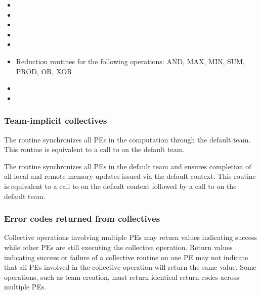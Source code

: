 \begin{DeprecateBlock}
\begin{itemize}
\item {}
\item {}
\item {}
\item {}
\item {}
\item Reduction routines for the following operations: AND, MAX, MIN, SUM, PROD, OR, XOR
\item {}
\item {}
\end{itemize}

\end{DeprecateBlock}


\subsubsection*{Team-implicit collectives}

The  routine synchronizes all \acp{PE} in the
computation through the default team. This routine is equivalent to a
call to  on the default team.

The  routine synchronizes all \acp{PE} in
the default team and ensures completion of all local and remote memory
updates issued via the default context.  This routine is equivalent to
a call to  on the default context followed by a
call to  on the default team.

\subsubsection*{Error codes returned from collectives}

Collective operations involving multiple \acp{PE} may return values
indicating success while other \acp{PE} are still executing the
collective operation. Return values indicating success or failure of a
collective routine on one \ac{PE} may not indicate that all \acp{PE}
involved in the collective operation will return the same value. Some
operations, such as team creation, must return identical return codes
across multiple \acp{PE}.
